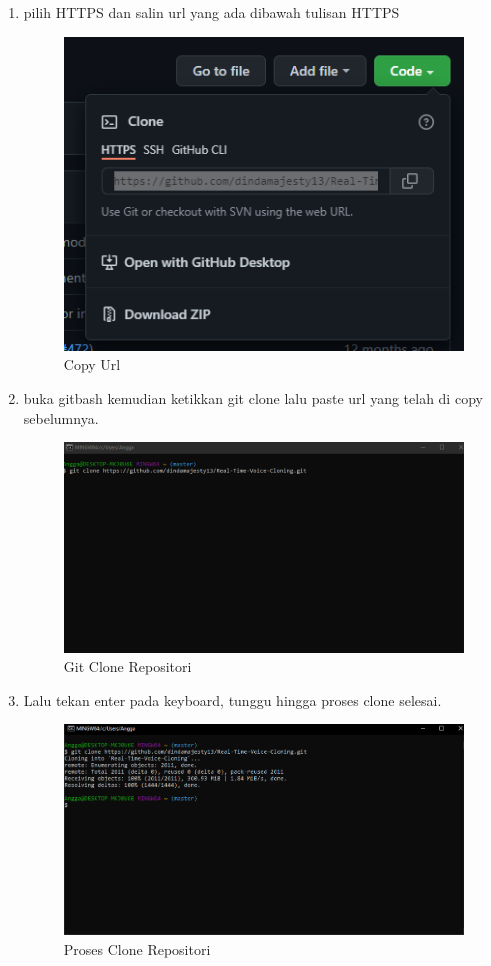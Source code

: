 \begin{enumerate}
\item pilih HTTPS dan salin url yang ada dibawah tulisan HTTPS
\begin{figure}[H]
\centering
\includegraphics[scale=.75]{figures/repo3}
\caption{Copy Url}
\label{repo3}
\end{figure}

\item buka gitbash kemudian ketikkan git clone lalu paste url yang telah di copy sebelumnya.
\begin{figure}[H]
\centering
\includegraphics[scale=.4]{figures/repo4}
\caption{Git Clone Repositori}
\label{repo4}
\end{figure}

\item Lalu tekan enter pada keyboard, tunggu hingga proses clone selesai.
\begin{figure}[H]
\centering
\includegraphics[scale=.4]{figures/repo5}
\caption{Proses Clone Repositori}
\label{repo5}
\end{figure}


\end{enumerate}

